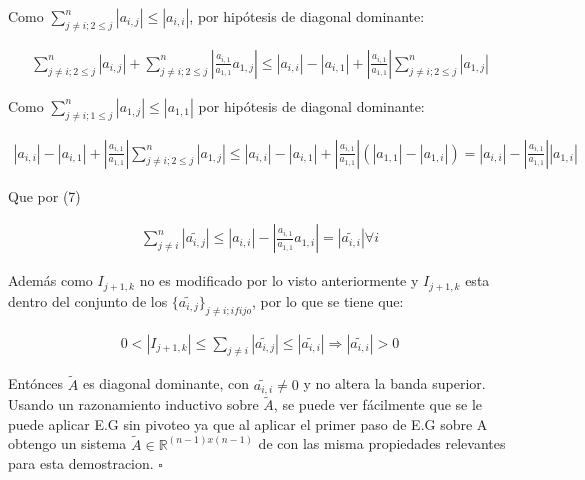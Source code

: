 \documentclass[12pt,a4paper]{article}
\begin{document}
Como $\sum^n_{j\neq i; 2\leq j} \left| a_{i,j} \right| \leq \left| a_{i,i} \right| $, por hipótesis de diagonal dominante:

\begin{align*}
\sum ^{n}_{j\neq i; 2\leq j} \left| a_{i,j} \right| + \sum ^{n}_{j\neq i; 2\leq j} \left| \frac{a_{i,1}}{a_{1,1}} a_{1,j} \right| \leq \left| a_{i,i} \right| - \left| a_{i,1} \right| + \left| \frac{a_{i,1}}{a_{1,1}} \right| \sum ^n_{j\neq i; 2\leq j} \left| a_{1,j} \right|
\end{align*}

Como $\sum^n_{j\neq i; 1\leq j} \left| a_{1,j} \right| \leq \left| a_{1,1} \right|$ por hipótesis de diagonal dominante:

\begin{align*}
 \left| a_{i,i} \right| - \left| a_{i,1} \right| + \left| \frac{a_{i,1}}{a_{1,1}} \right| \sum ^n_{j\neq i; 2\leq j} \left| a_{1,j} \right| \leq \left| a_{i,i} \right| - \left| a_{i,1} \right| + \left| \frac{a_{i,1}}{a_{1,1}} \right| \left( \left| a_{1,1} \right| - \left| a_{1,i} \right| \right) = \left| a_{i,i} \right| - \left| \frac{a_{i,1}}{a_{1,1}} \right| \left|a_{1,i} \right|
\end{align*}

Que por (7)

\begin{align*}
\sum ^n_{j\neq i} \left| \widetilde{a_{i,j}} \right| \leq \left| a_{i,i} \right| - \left|\frac{a_{i,1}}{a_{1,1}} a_{1,i} \right| = \left| \widetilde{a_{i,i}} \right| \forall i
\end{align*}

Además como $I_{j+1,k}$ no es modificado por lo visto anteriormente y $I_{j+1,k}$ esta dentro del conjunto de los $\{ \widetilde{a_{i,j}} \}_{j\neq i; i fijo}$, por lo que se tiene que:

\begin{align*}
0 < \left| I_{j+1,k} \right| \leq \sum _{j \neq i} \left| \widetilde{a_{i,j}} \right| \leq \left| \widetilde{a_{i,i}} \right| \Rightarrow \left| \widetilde{a_{i,i}} \right| > 0
\end{align*}

Entónces $\widetilde{A}$ es diagonal dominante, con $\widetilde{a_{i,i}} \neq 0$ y no altera la banda superior. Usando un razonamiento inductivo sobre $\widetilde{A}$, se puede ver fácilmente que se le puede aplicar E.G sin pivoteo ya que al aplicar el primer paso de E.G sobre A obtengo un sistema $\widetilde{A} \in \mathds{R}^{(n-1)x(n-1)}$ de con las misma propiedades relevantes para esta demostracion. $\square$
\end{document}

